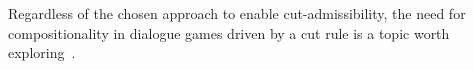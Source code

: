 %

Regardless of the chosen approach to enable cut-admissibility, the need for compositionality in dialogue games driven by a cut rule is a topic worth exploring~\cite{dutilh18}.

